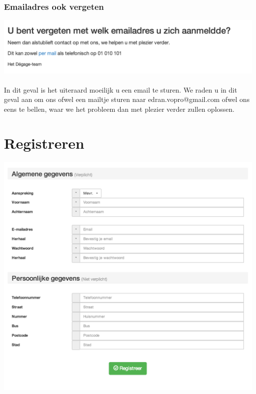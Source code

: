 \documentclass[11pt,a4paper,oneside]{article}
\begin{document}
\subsubsection{Emailadres ook vergeten}
\includegraphics[scale=0.5]{img/emailookvergeten} \\\\
In dit geval is het uiteraard moeilijk u een email te sturen. We raden u in dit geval aan om ons ofwel een mailtje sturen naar edran.vopro@gmail.com ofwel ons eens te bellen, waar we het probleem dan met plezier verder zullen oplossen.


\section{Registreren}

\includegraphics[scale=0.6]{img/registreren99} \\\\
\end{document}
